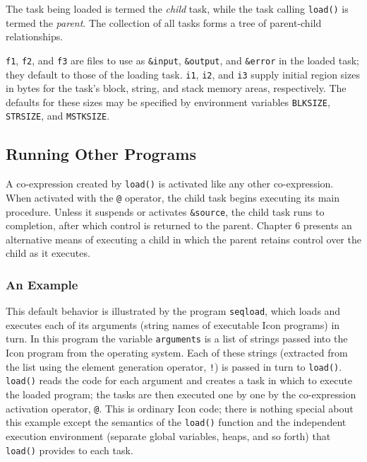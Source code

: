 The task being loaded is termed the {\em child\/} task, while
the task calling {\tt load()} is termed the {\em parent\/}.  The
collection of all tasks forms a tree of parent-child relationships.

{\tt f1}, {\tt f2}, and {\tt f3} are files to use as
{\tt \&input}, {\tt \&output}, and {\tt \&error} in the loaded
task; they default to those of the loading task.  {\tt i1}, {\tt i2},
and {\tt i3} supply initial region sizes in bytes for the
task's block, string, and stack memory areas, respectively. 
The defaults for these sizes may be specified by environment variables
{\tt BLKSIZE}, {\tt STRSIZE}, and {\tt MSTKSIZE}.

\subsection{Running Other Programs}

A co-expression created by {\tt load()} is activated like any other
co-expression. When activated with the {\tt @} operator, the child
task begins executing its main procedure. Unless it suspends or
activates {\tt \&source},
the child task runs to completion, after which control is returned
to the parent.  Chapter 6 presents an alternative means of executing
a child in which the parent retains control over the child as it executes.

\subsubsection*{An Example}


This default behavior is illustrated by the program {\tt seqload},
which loads and executes each of its arguments (string names of
executable Icon programs) in turn.  In this program the variable
{\tt arguments} is a list of strings passed into the Icon program from
the operating system.  Each of these strings (extracted from the list
using the element generation operator, {\tt !}) is passed in turn to
{\tt load()}.  {\tt load()} reads the code for each argument and
creates a task in which to execute the loaded program; the tasks are
then executed one by one by the co-expression activation operator,
{\tt @}.  This is ordinary Icon code; there is nothing special about
this example except the semantics of the {\tt load()} function and the
independent execution environment (separate global variables, heaps,
and so forth) that {\tt load()} provides to each task.

